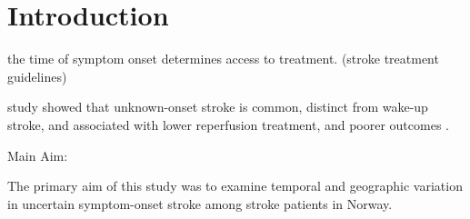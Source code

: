 \section{Introduction}

the time of symptom onset determines access to treatment. (stroke treatment
guidelines)

study showed that unknown-onset stroke is common, distinct from wake-up stroke,
and associated with lower reperfusion treatment, and poorer outcomes
\cite{soyland_wake-up_2022}.

Main Aim:

The primary aim of this study was to examine temporal and geographic variation
in uncertain symptom-onset stroke among stroke patients in Norway.
